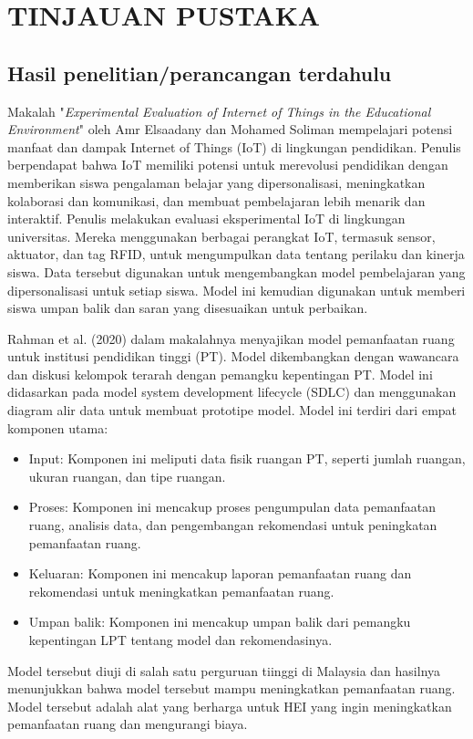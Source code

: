 \chapter{TINJAUAN PUSTAKA}

\section{Hasil penelitian/perancangan terdahulu}
Makalah "\emph{Experimental Evaluation of Internet of Things in the Educational Environment}" oleh Amr Elsaadany dan Mohamed Soliman mempelajari potensi manfaat dan dampak Internet of Things (IoT) di lingkungan pendidikan. Penulis berpendapat bahwa IoT memiliki potensi untuk merevolusi pendidikan dengan memberikan siswa pengalaman belajar yang dipersonalisasi, meningkatkan kolaborasi dan komunikasi, dan membuat pembelajaran lebih menarik dan interaktif.
Penulis melakukan evaluasi eksperimental IoT di lingkungan universitas. Mereka menggunakan berbagai perangkat IoT, termasuk sensor, aktuator, dan tag RFID, untuk mengumpulkan data tentang perilaku dan kinerja siswa. Data tersebut digunakan untuk mengembangkan model pembelajaran yang dipersonalisasi untuk setiap siswa. Model ini kemudian digunakan untuk memberi siswa umpan balik dan saran yang disesuaikan untuk perbaikan.

Rahman et al. (2020) dalam makalahnya menyajikan model pemanfaatan ruang untuk institusi pendidikan tinggi (PT). Model dikembangkan dengan wawancara dan diskusi kelompok terarah dengan pemangku kepentingan PT. Model ini didasarkan pada model system development lifecycle (SDLC) dan menggunakan diagram alir data untuk membuat prototipe model.
Model ini terdiri dari empat komponen utama:
\begin{itemize}
    \item Input: Komponen ini meliputi data fisik ruangan PT, seperti jumlah ruangan, ukuran ruangan, dan tipe ruangan.
    \item Proses: Komponen ini mencakup proses pengumpulan data pemanfaatan ruang, analisis data, dan pengembangan rekomendasi untuk peningkatan pemanfaatan ruang.
    \item Keluaran: Komponen ini mencakup laporan pemanfaatan ruang dan rekomendasi untuk meningkatkan pemanfaatan ruang.
    \item Umpan balik: Komponen ini mencakup umpan balik dari pemangku kepentingan LPT tentang model dan rekomendasinya.
\end{itemize}
Model tersebut diuji di salah satu perguruan tiinggi di Malaysia dan hasilnya menunjukkan bahwa model tersebut mampu meningkatkan pemanfaatan ruang. Model tersebut adalah alat yang berharga untuk HEI yang ingin meningkatkan pemanfaatan ruang dan mengurangi biaya.

